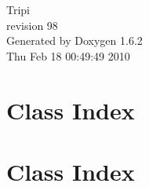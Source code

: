 \documentclass[a4paper]{book}
\begin{document}
\hypersetup{pageanchor=false}
\begin{titlepage}
\vspace*{7cm}
\begin{center}
{\Large Tripi \\[1ex]\large revision 98 }\\
\vspace*{1cm}
{\large Generated by Doxygen 1.6.2}\\
\vspace*{0.5cm}
{\small Thu Feb 18 00:49:49 2010}\\
\end{center}
\end{titlepage}
\clearemptydoublepage
{}
\tableofcontents
\clearemptydoublepage
{}
\hypersetup{pageanchor=true}
\chapter{Class Index}

\chapter{Class Index}

\end{document}
